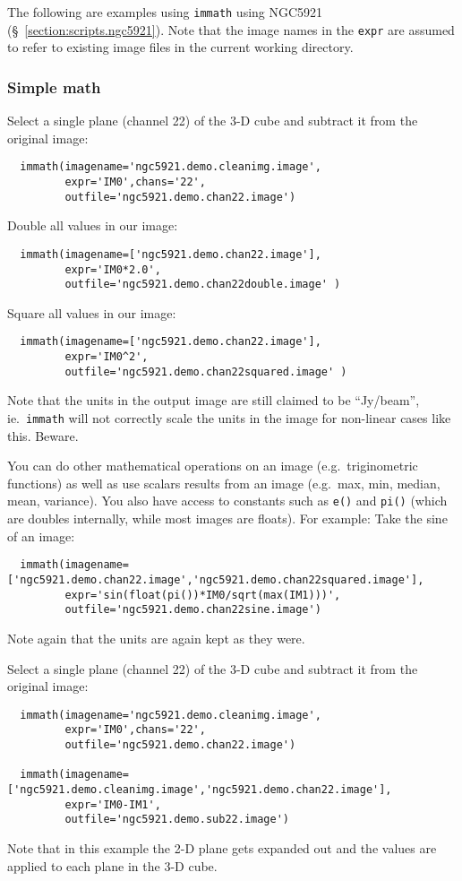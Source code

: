 The following are examples using {\tt immath} using NGC5921 
(\S~\ref{section:scripts.ngc5921}).  Note that the image
names in the {\tt expr} are assumed to refer to existing image files
in the current working directory.

\subsubsection{Simple math}
\label{section:analysis.immath.examples.math}

Select a single plane (channel 22) of the 3-D cube and  
subtract it from the original image: 
\small
\begin{verbatim}
  immath(imagename='ngc5921.demo.cleanimg.image',
         expr='IM0',chans='22',
         outfile='ngc5921.demo.chan22.image')
\end{verbatim}
\normalsize

Double all values in our image:
\small
\begin{verbatim}
  immath(imagename=['ngc5921.demo.chan22.image'],
         expr='IM0*2.0',
         outfile='ngc5921.demo.chan22double.image' )
\end{verbatim}
\normalsize
    
Square all values in our image:
\small
\begin{verbatim}
  immath(imagename=['ngc5921.demo.chan22.image'],
         expr='IM0^2',
         outfile='ngc5921.demo.chan22squared.image' )
\end{verbatim}
\normalsize
Note that the units in the output image are still claimed to be
``Jy/beam'', ie.\ {\tt immath} will not correctly scale the units
in the image for non-linear cases like this.  Beware.

You can do other mathematical operations on an image (e.g.\
triginometric functions) as well as use scalars results from an image
(e.g.\ max, min, median, mean, variance).  You also have access to
constants such as {\tt e()} and {\tt pi()} (which are doubles
internally, while most images are floats). For example:
Take the sine of an image:
\small
\begin{verbatim}
  immath(imagename=['ngc5921.demo.chan22.image','ngc5921.demo.chan22squared.image'],
         expr='sin(float(pi())*IM0/sqrt(max(IM1)))',
         outfile='ngc5921.demo.chan22sine.image')
\end{verbatim}
\normalsize
Note again that the units are again kept as they were.
    
Select a single plane (channel 22) of the 3-D cube and  
subtract it from the original image: 
\small
\begin{verbatim}
  immath(imagename='ngc5921.demo.cleanimg.image',
         expr='IM0',chans='22',
         outfile='ngc5921.demo.chan22.image')

  immath(imagename=['ngc5921.demo.cleanimg.image','ngc5921.demo.chan22.image'],
         expr='IM0-IM1',
         outfile='ngc5921.demo.sub22.image')
\end{verbatim}
\normalsize
Note that in this example the 2-D plane gets expanded out and the
values are applied to each plane in the 3-D cube. 

